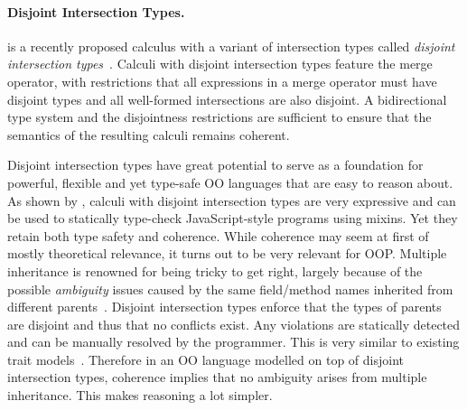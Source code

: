 \paragraph{Disjoint Intersection Types.}
\oname is a recently proposed calculus with a variant of intersection types 
called \emph{disjoint intersection types}~\citep{oliveira2016disjoint}.
Calculi with disjoint intersection types feature the merge 
operator, with restrictions that all expressions in a merge 
operator must have disjoint types and all well-formed intersections 
are also disjoint. A bidirectional type system and the disjointness restrictions are
sufficient to ensure that the semantics of the resulting calculi remains 
coherent. 

\begin{comment}
The merge operator was introduced by Reynolds 
and Forsythe and adopted by a few other calculi as well~\citep{}.
Unfortunately, while the merge operator is powerful, it makes 
it hard to get a \emph{coherent} semantics. \bruno{what is coherence}
Perhaps because 
of this issue the merge operator has not been adopted by 
many language designs. Disjoint intersection types provide 
a remedy for the coherence problem, by imposing restrictions 
on the uses of merges and on the formation of intersection types. 
\bruno{merge operator ==> models inheritance; intersection types ==> 
model subtyping}

In essence disjoint intersection types retain most of the 
expressive power of the merge operator.
For example, they can 
be used to model powerful forms of extensible records~\citep{}.
\end{comment}

Disjoint intersection types have great potential to serve as a foundation for
powerful, flexible and yet type-safe OO languages that are easy to reason
about. As shown by \citet{alpuimdisjoint}, calculi with disjoint intersection
types are very
expressive and can be used to statically type-check JavaScript-style programs
using mixins. Yet they retain both type safety and coherence. While
coherence may seem at first of mostly theoretical relevance, it
turns out to be very relevant for OOP. Multiple
inheritance is renowned for being tricky to get right, largely because of the
possible \emph{ambiguity} issues caused by the same field/method names
inherited from different parents~\citep{bracha1990mixin, scharli2003traits}. Disjoint intersection types
enforce that the types of parents are disjoint and thus that no conflicts exist.
Any violations are statically detected and can be manually resolved by the
programmer.
This is very similar
to existing trait models~\citep{fisher2004typed,
  ducasse2006traits}. Therefore in an OO language
modelled on top of disjoint intersection types, coherence implies
that no ambiguity arises from multiple inheritance. This makes
reasoning a lot simpler.

